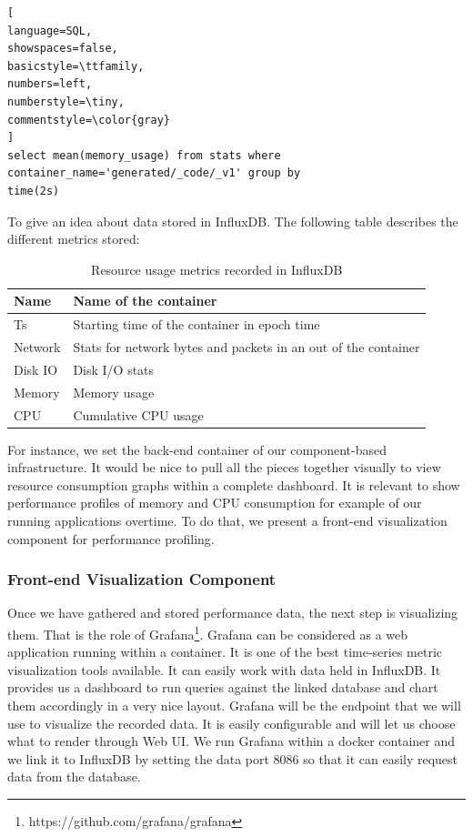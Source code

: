 \begin{lstlisting}[
language=SQL,
showspaces=false,
basicstyle=\ttfamily,
numbers=left,
numberstyle=\tiny,
commentstyle=\color{gray}
]
select mean(memory_usage) from stats where 
container_name='generated/_code/_v1' group by 
time(2s)
\end{lstlisting}
To give an idea about data stored in InfluxDB. The following table describes the different metrics stored:
 \begin{table}[h]
 	\begin{center}
 		\begin{tabular}{|p{1cm}|p{6.9cm}|}
 			\hline
 			 Name & Name of the container \\
 			\hline
 			 Ts & Starting time of the container in epoch time \\
 			\hline
 			 Network &  Stats for network bytes and packets in an out of the container \\
 			\hline
 			 Disk IO &  Disk I/O stats \\
 			\hline
 			 Memory &  Memory usage \\
 			
 			\hline
 		   	CPU &  Cumulative CPU usage \\
 			\hline
 			
 		\end{tabular}
 		
 	\end{center}
 	\caption {Resource usage metrics recorded in InfluxDB}
 \end{table}
For instance, we set the back-end container of our component-based infrastructure. It would be nice to pull all the pieces together visually to view resource consumption graphs within a complete dashboard. It is relevant to show performance profiles of memory and CPU consumption for example of our running applications overtime. To do that, we present a front-end visualization component for performance profiling. 

\subsubsection{Front-end Visualization Component}
Once we have gathered and stored performance data, the next step is visualizing them. That is the role of Grafana\footnote{https://github.com/grafana/grafana}. Grafana can be considered as a web application running within a container. It is one of the best time-series metric visualization tools available. It can easily work with data held in InfluxDB. It provides us a dashboard to run queries against the linked database and chart them accordingly in a very nice layout. Grafana will be the endpoint that we will use to visualize the recorded data. It is easily configurable and will let us choose what to render through Web UI. We run Grafana within a docker container and we link it to InfluxDB by setting the data port 8086 so that it can easily request data from the database.

